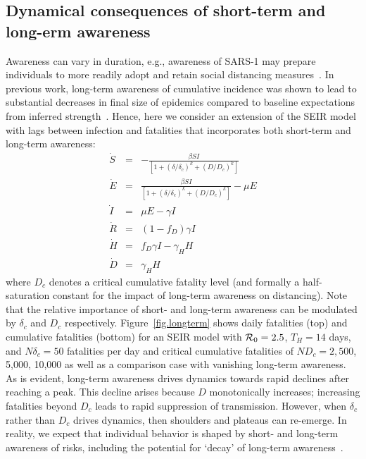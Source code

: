 \subsection{Dynamical consequences of short-term and long-erm awareness}
Awareness can vary in duration, e.g., awareness
of SARS-1 may prepare individuals to more
readily adopt and retain
social distancing measures~\citep{chen_2020social,leung_lancet2020}.  
In previous
work, long-term awareness of cumulative incidence
was shown to lead to substantial decreases
in final size of epidemics compared
to baseline expectations from inferred 
strength~\citep{eksin2019systematic}. Hence, 
here we consider an extension of the SEIR model
with lags between infection and fatalities that incorporates
both short-term and long-term awareness:
\begin{eqnarray}
\dot{S} &=& -\frac{\beta SI}{\left[1+\left(\delta/\delta_c\right)^{k}+\left(D/D_c\right)^k\right]}\\
\dot{E} &=& \frac{\beta SI}{\left[1+\left(\delta/\delta_c\right)^{k}+\left(D/D_c\right)^k\right]}-\mu E\\
\dot{I} &=& \mu E-\gamma I \\
\dot{R} &=& (1-f_D)\gamma I\\
\dot{H} &=& f_D\gamma I - \gamma_H H\\
\dot{D} &=& \gamma_H H
\end{eqnarray}
where $D_c$ denotes a critical cumulative fatality level
(and formally a half-saturation constant for the impact
of long-term awareness on distancing).
Note that the relative importance of short- and long-term
awareness can be modulated by $\delta_c$ and $D_c$ respectively.
Figure~\ref{fig.longterm} shows 
daily fatalities (top)
and cumulative fatalities (bottom)
for an SEIR model with ${\cal{R}}_0=2.5$, $T_H=14$ days, and $N\delta_c=50$ 
fatalities per day and critical cumulative fatalities of
$ND_c=2,500$, 5,000, 10,000 as well as a comparison case with vanishing
long-term awareness. As is evident, 
long-term awareness drives dynamics towards rapid declines
after reaching a peak. This decline arises because
$D$ monotonically increases;
increasing fatalities beyond $D_c$ leads to rapid suppression
of transmission.  However, when $\delta_c$ rather than
$D_c$ drives dynamics, then shoulders and plateaus can re-emerge.
In reality, we expect that individual
behavior is shaped by short- and long-term awareness of risks, including
the potential for `decay' of long-term awareness~\citep{funk2009spread,funk2010modelling}.

